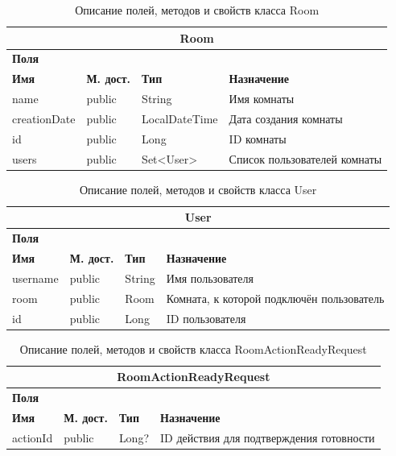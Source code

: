 \documentclass{../includes/TechDoc}
\begin{document}
    \begin{table}[h]
		\caption{\label{tab:class-WebsocketEventListener-table}Описание полей, методов и свойств класса Room}
	    \begin{tabularx}{\textwidth}{|l|l|l|X|}
	    	\hline
	  		\multicolumn{4}{|c|}{Room} \\ \hline
	  		\multicolumn{4}{|l|}{\textbf{Поля}} \\ \hline
	  		\textbf{Имя} & \textbf{М. дост.} & \textbf{Тип} & \textbf{Назначение} \\ \hline
			name & public & String & Имя комнаты \\ \hline
			creationDate & public & LocalDateTime & Дата создания комнаты \\ \hline
			id & public & Long & ID комнаты \\ \hline
			users & public & Set<User> & Список пользователей комнаты \\ \hline
		\end{tabularx}
    \end{table}

    \begin{table}[h]
		\caption{\label{tab:class-WebsocketEventListener-table}Описание полей, методов и свойств класса User}
	    \begin{tabularx}{\textwidth}{|l|l|l|X|}
	    	\hline
	  		\multicolumn{4}{|c|}{User} \\ \hline
	  		\multicolumn{4}{|l|}{\textbf{Поля}} \\ \hline
	  		\textbf{Имя} & \textbf{М. дост.} & \textbf{Тип} & \textbf{Назначение} \\ \hline
			username & public & String & Имя пользователя \\ \hline
			room & public & Room & Комната, к которой подключён пользователь \\ \hline
			id & public & Long & ID пользователя \\ \hline
		\end{tabularx}
    \end{table}

    \begin{table}[h]
		\caption{\label{tab:class-WebsocketEventListener-table}Описание полей, методов и свойств класса RoomActionReadyRequest}
	    \begin{tabularx}{\textwidth}{|l|l|l|X|}
	    	\hline
	  		\multicolumn{4}{|c|}{RoomActionReadyRequest} \\ \hline
	  		\multicolumn{4}{|l|}{\textbf{Поля}} \\ \hline
	  		\textbf{Имя} & \textbf{М. дост.} & \textbf{Тип} & \textbf{Назначение} \\ \hline
			actionId & public & Long? & ID действия для подтверждения готовности \\ \hline
		\end{tabularx}
    \end{table}
\end{document}
